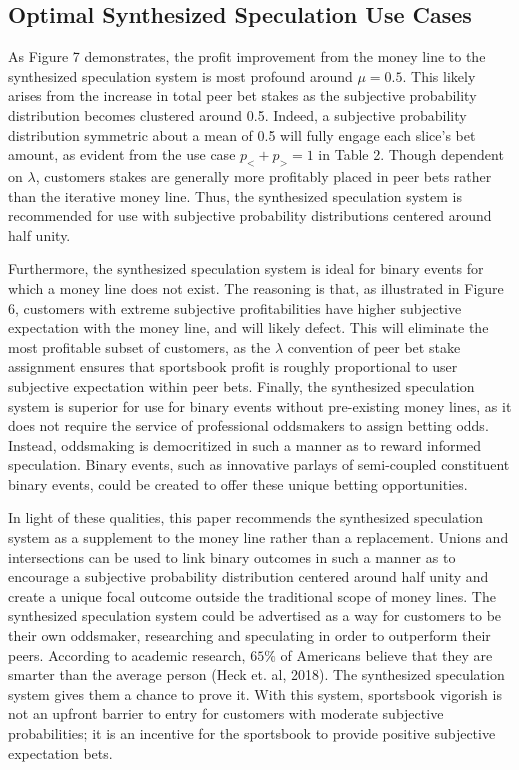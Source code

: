 \documentclass[sn-mathphys-num]{sn-jnl}
\theoremstyle{thmstyleone}%
\theoremstyle{thmstyletwo}%
\theoremstyle{thmstylethree}%
\begin{document}
\subsection{Optimal Synthesized Speculation Use Cases}

As Figure 7 demonstrates, the profit improvement from the money line to the synthesized speculation system is most profound around $\mu = 0.5$. This likely arises from the increase in total peer bet stakes as the subjective probability distribution becomes clustered around 0.5. Indeed, a subjective probability distribution symmetric about a mean of 0.5 will fully engage each slice's bet amount, as evident from the use case  $p_< + p_> = 1$ in Table 2. Though dependent on $\lambda$, customers stakes are generally more profitably placed in peer bets rather than the iterative money line. Thus, the synthesized speculation system is recommended for use with subjective probability distributions centered around half unity. 

Furthermore, the synthesized speculation system is ideal for binary events for which a money line does not exist. The reasoning is that, as illustrated in Figure 6, customers with extreme subjective profitabilities have higher subjective expectation with the money line, and will likely defect. This will eliminate the most profitable subset of customers, as the $\lambda$ convention of peer bet stake assignment ensures that sportsbook profit is roughly proportional to user subjective expectation within peer bets. Finally, the synthesized speculation system is superior for use for binary events without pre-existing money lines, as it does not require the service of professional oddsmakers to assign betting odds. Instead, oddsmaking is democritized in such a manner as to reward informed speculation. Binary events, such as innovative parlays of semi-coupled constituent binary events, could be created to offer these unique betting opportunities.

In light of these qualities, this paper recommends the synthesized speculation system as a supplement to the money line rather than a replacement. Unions and intersections can be used to link binary outcomes in such a manner as to encourage a subjective probability distribution centered around half unity and create a unique focal outcome outside the traditional scope of money lines. The synthesized speculation system could be advertised as a way for customers to be their own oddsmaker, researching and speculating in order to outperform their peers. According to academic research, $65\%$ of Americans believe that they are smarter than the average person (Heck et. al, 2018). The synthesized speculation system gives them a chance to prove it. With this system, sportsbook vigorish is not an upfront barrier to entry for customers with moderate subjective probabilities; it is an incentive for the sportsbook to provide positive subjective expectation bets. 
\end{document}

